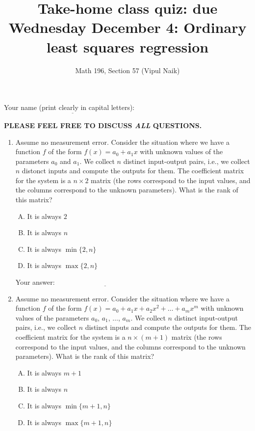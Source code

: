 \documentclass[10pt]{amsart}
\title{Take-home class quiz: due Wednesday December 4: Ordinary least squares regression}
\author{Math 196, Section 57 (Vipul Naik)}
\begin{document}
\maketitle

Your name (print clearly in capital letters): $\underline{\qquad\qquad\qquad\qquad\qquad\qquad\qquad\qquad\qquad\qquad}$

{\bf PLEASE FEEL FREE TO DISCUSS {\em ALL} QUESTIONS.}

\begin{enumerate}

\item Assume no measurement error. Consider the situation where we
  have a function $f$ of the form $f(x) =a_0 + a_1x$ with unknown
  values of the parameters $a_0$ and $a_1$. We collect $n$ distinct
  input-output pairs, i.e., we collect $n$ distonct inputs and compute
  the outputs for them. The coefficient matrix for the system is a $n
  \times 2$ matrix (the rows correspond to the input values, and the
  columns correspond to the unknown parameters). What is the rank of
  this matrix?

  \begin{enumerate}[(A)]
  \item It is always $2$
  \item It is always $n$
  \item It is always $\min \{ 2, n \}$
  \item It is always $\max \{ 2, n \}$
  \end{enumerate}

  \vspace{0.1in}
  Your answer: $\underline{\qquad\qquad\qquad\qquad\qquad\qquad\qquad}$
  \vspace{0.1in}

\item Assume no measurement error. Consider the situation where we
  have a function $f$ of the form $f(x) =a_0 + a_1x + a_2x^2 + \dots +
  a_mx^m$ with unknown values of the parameters $a_0$, $a_1$, $\dots$,
  $a_m$. We collect $n$ distinct input-output pairs, i.e., we collect
  $n$ distinct inputs and compute the outputs for them. The
  coefficient matrix for the system is a $n \times (m + 1)$ matrix
  (the rows correspond to the input values, and the columns correspond
  to the unknown parameters). What is the rank of this matrix?

  \begin{enumerate}[(A)]
  \item It is always $m + 1$
  \item It is always $n$
  \item It is always $\min \{ m + 1, n \}$
  \item It is always $\max \{ m + 1, n \}$
  \end{enumerate}


\end{enumerate}
\end{document}
